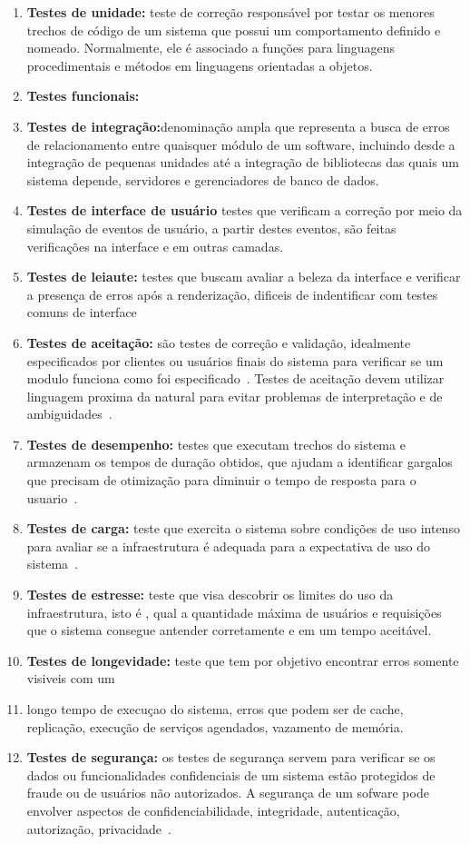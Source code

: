 \begin{enumerate}

\item \textbf{Testes de unidade:} teste de correção responsável por testar os 
menores trechos de código de um sistema que possui um comportamento definido e nomeado.
%
Normalmente, ele é associado a funções para linguagens procedimentais e métodos em 
linguagens orientadas a objetos.
\item \textbf{Testes funcionais:}
\item \textbf{Testes de integração:}denominação ampla que representa a busca de erros 
de relacionamento entre quaisquer módulo de um software, incluindo desde a integração 
de pequenas unidades até a integração de bibliotecas das quais um sistema depende, 
servidores e gerenciadores de banco de dados.
\item \textbf{Testes de interface de usuário} testes que verificam a correção por meio 
da simulação de eventos de usuário, a partir destes eventos, são feitas verificações 
na interface e em outras camadas.
\item \textbf{Testes de leiaute:} testes que buscam avaliar a beleza da interface e 
verificar a presença de erros após a renderização, dificeis de indentificar com testes 
comuns de interface
\item \textbf{Testes de aceitação:} são testes de correção e validação, idealmente 
especificados por clientes ou usuários finais do sistema para verificar se um modulo 
funciona como foi especificado~\cite{martin2005}.
%
Testes de aceitação devem utilizar linguagem proxima da natural para evitar problemas 
de interpretação e de ambiguidades~\cite{cunningham2005}.
\item \textbf{Testes de desempenho:} testes que executam trechos do sistema e armazenam 
os tempos de duração obtidos, que ajudam a identificar gargalos que precisam de otimização 
para diminuir o tempo de resposta  para o usuario~\cite{liu2009}.
\item \textbf{Testes de carga:}  teste que exercita o sistema sobre condições de uso 
intenso para avaliar se a infraestrutura é adequada para a expectativa de uso do sistema~\cite{avritze1994}.
\item \textbf{Testes de estresse:} teste que visa descobrir os limites do uso da infraestrutura, 
isto é , qual a quantidade máxima de usuários e requisições que o sistema consegue antender 
corretamente e em um tempo aceitável.
\item \textbf{Testes de longevidade:} teste que tem por objetivo encontrar erros somente 
visiveis com um\item longo tempo de execuçao do sistema, erros que podem ser de cache, replicação, 
execução de serviços agendados, vazamento de memória.
\item \textbf{Testes de segurança:} os testes de segurança servem para verificar se os 
dados ou funcionalidades confidenciais de um sistema  estão protegidos de fraude ou de 
usuários não autorizados. A segurança de um sofware pode envolver aspectos de confidenciabilidade, 
integridade, autenticação, autorização, privacidade~\cite{whittaker2006}.





\end{enumerate}
